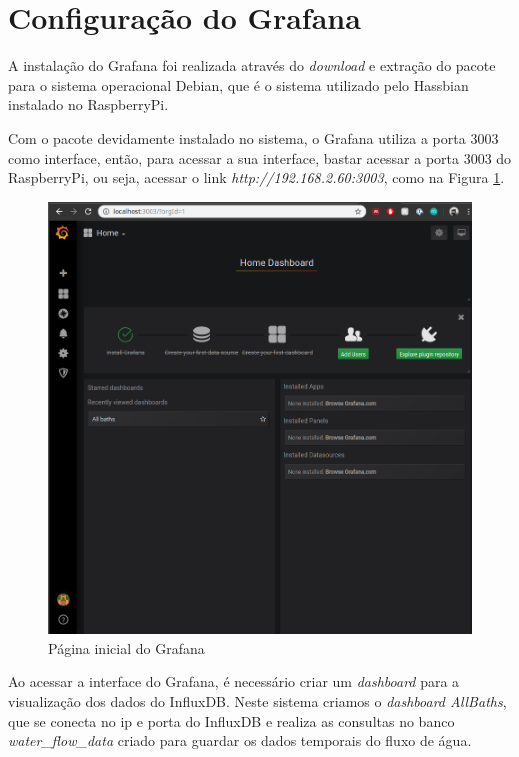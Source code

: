 \section{Configuração do Grafana}

A instalação do Grafana foi realizada através do \textit{download} e extração do pacote para o sistema operacional Debian, que é o sistema utilizado pelo Hassbian instalado no RaspberryPi.

Com o pacote devidamente instalado no sistema, o Grafana utiliza a porta 3003 como interface, então, para acessar a sua interface, bastar acessar a porta 3003 do RaspberryPi, ou seja, acessar o link \textit{http://192.168.2.60:3003}, como na Figura \ref{fig:grafanahome}.

\begin{figure}[htbp]
	\centering
	\includegraphics[width=1\linewidth]{figuras/grafanahome.png}
	\caption{Página inicial do Grafana}
	\label{fig:grafanahome}
\end{figure}

Ao acessar a interface do Grafana, é necessário criar um \textit{dashboard} para a visualização dos dados do InfluxDB. Neste sistema criamos o \textit{dashboard AllBaths}, que se conecta no ip e porta do InfluxDB e realiza as consultas no banco \textit{water\_flow\_data} criado para guardar os dados temporais do fluxo de água.

